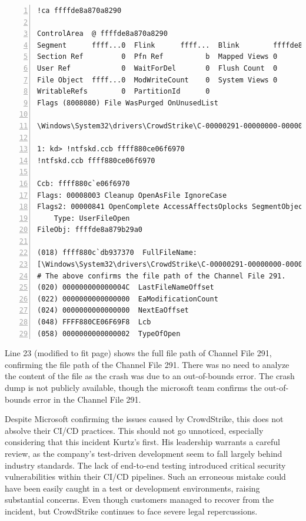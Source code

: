 \begin{lstlisting}[caption=Inspecting csagent.sys, numbers=left]
!ca ffffde8a870a8290

ControlArea  @ ffffde8a870a8290
Segment      ffff...0  Flink      ffff...  Blink        ffffde8a870a7d98
Section Ref         0  Pfn Ref          b  Mapped Views 0
User Ref            0  WaitForDel       0  Flush Count  0
File Object  ffff...0  ModWriteCount    0  System Views 0
WritableRefs        0  PartitionId      0  
Flags (8008080) File WasPurged OnUnusedList 

\Windows\System32\drivers\CrowdStrike\C-00000291-00000000-00000032.sys
    
1: kd> !ntfskd.ccb ffff880ce06f6970
!ntfskd.ccb ffff880ce06f6970
    
Ccb: ffff880c`e06f6970
Flags: 00008003 Cleanup OpenAsFile IgnoreCase
Flags2: 00000841 OpenComplete AccessAffectsOplocks SegmentObjectReferenced
    Type: UserFileOpen
FileObj: ffffde8a879b29a0
    
(018) ffff880c`db937370  FullFileName: 
[\Windows\System32\drivers\CrowdStrike\C-00000291-00000000-00000032.sys]
# The above confirms the file path of the Channel File 291.
(020) 000000000000004C  LastFileNameOffset 
(022) 0000000000000000  EaModificationCount 
(024) 0000000000000000  NextEaOffset 
(048) FFFF880CE06F69F8  Lcb 
(058) 0000000000000002  TypeOfOpen 
\end{lstlisting}

\noindent

\noindent
Line 23 (modified to fit page) shows the full file path of Channel File 291, confirming the file path of the Channel File 291.
There was no need to analyze the content of the file as the crash was due to an out-of-bounds error. The 
crash dump is not publicly available, though the microsoft team confirms the out-of-bounds error in the Channel File 291.

Despite Microsoft confirming the issues caused by CrowdStrike, this does not absolve their CI/CD practices.
This should not go unnoticed, especially considering that this incident Kurtz's first.
His leadership warrants a careful review, as the company's test-driven development seem to fall largely behind industry standards.
The lack of end-to-end testing introduced critical security vulnerabilities within their CI/CD pipelines. Such an erroneous
mistake could have been easily caught in a test or development environments, raising substantial concerns.
Even though customers managed to recover from the incident, but CrowdStrike continues to face severe legal repercussions.
